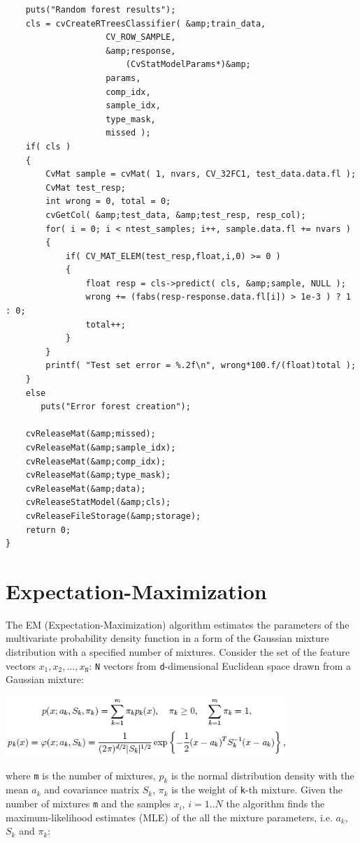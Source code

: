\begin{lstlisting}
    puts("Random forest results");
    cls = cvCreateRTreesClassifier( &amp;train_data, 
				    CV_ROW_SAMPLE, 
				    &amp;response,
        			    (CvStatModelParams*)&amp; 
				    params, 
				    comp_idx, 
				    sample_idx, 
				    type_mask, 
				    missed );
    if( cls )
    {
        CvMat sample = cvMat( 1, nvars, CV_32FC1, test_data.data.fl );
        CvMat test_resp;
        int wrong = 0, total = 0;
        cvGetCol( &amp;test_data, &amp;test_resp, resp_col);
        for( i = 0; i < ntest_samples; i++, sample.data.fl += nvars )
        {
            if( CV_MAT_ELEM(test_resp,float,i,0) >= 0 )
            {
                float resp = cls->predict( cls, &amp;sample, NULL );
                wrong += (fabs(resp-response.data.fl[i]) > 1e-3 ) ? 1 : 0;
                total++;
            }
        }
        printf( "Test set error = %.2f\n", wrong*100.f/(float)total );
    }
    else
       puts("Error forest creation");

    cvReleaseMat(&amp;missed);
    cvReleaseMat(&amp;sample_idx);
    cvReleaseMat(&amp;comp_idx);
    cvReleaseMat(&amp;type_mask);
    cvReleaseMat(&amp;data);
    cvReleaseStatModel(&amp;cls);
    cvReleaseFileStorage(&amp;storage);
    return 0;
}
\end{lstlisting}

\section{Expectation-Maximization}

The EM (Expectation-Maximization) algorithm estimates the parameters of the multivariate probability density function in a form of the Gaussian mixture distribution with a specified number of mixtures.
\newline
\newline
Consider the set of the feature vectors {$x_1, x_2,...,x_\texttt{N}$}: \texttt{N} vectors from \texttt{d}-dimensional Euclidean space drawn from a Gaussian mixture:

\includegraphics[width=0.8\textwidth]{pics/em1.png}

where \texttt{m} is the number of mixtures, $p_k$ is the normal distribution density with the mean $a_k$ and covariance matrix $S_k$, $\pi_k$ is the weight of \texttt{k}-th mixture. Given the number of mixtures \texttt{m} and the samples {$x_i$, $i=1..N$} the algorithm finds the maximum-likelihood estimates (MLE) of the all the mixture parameters, i.e. $a_k$, $S_k$ and $\pi_k$:

